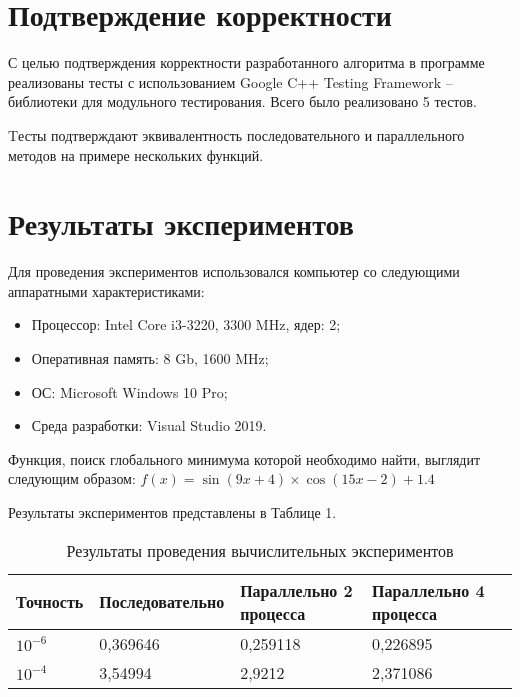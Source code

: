 \documentclass{report}
\begin{document}
\section*{Подтверждение корректности}
С целью подтверждения корректности разработанного алгоритма в программе реализованы тесты с использованием Google C++ Testing Framework – библиотеки для модульного тестирования. Всего было реализовано 5 тестов. 
\par Tесты подтверждают эквивалентность последовательного и параллельного методов на примере нескольких функций.
\newpage

\section*{Результаты экспериментов}
Для проведения экспериментов использовался компьютер со следующими аппаратными характеристиками:
\begin{itemize}
\item Процессор: Intel Core i3-3220, 3300 MHz, ядер: 2;
\item Оперативная память: 8 Gb, 1600 MHz;
\item ОС: Microsoft Windows 10 Pro;
\item Среда разработки: Visual Studio 2019.
\end{itemize}

\par Функция, поиск глобального минимума которой необходимо найти, выглядит следующим образом:
 $f(x) = \sin(9x + 4)\times{}\cos(15x -2) + 1.4 $
\par Результаты экспериментов представлены в Таблице 1.

\begin{table}[!h]
\caption{Результаты проведения вычислительных экспериментов}
\centering
\begin{tabular}{|l|l|l|l|l|}
\hline
Точность & Последовательно & Параллельно 2 процесса & Параллельно 4 процесса  \\ \hline
$10^{-6}$        & 0,369646        & 0,259118     & 0,226895      \\
$10^{-4}$        & 3,54994         & 2,9212     & 2,371086       \\
\hline
\end{tabular}
\end{table}
\end{document}
